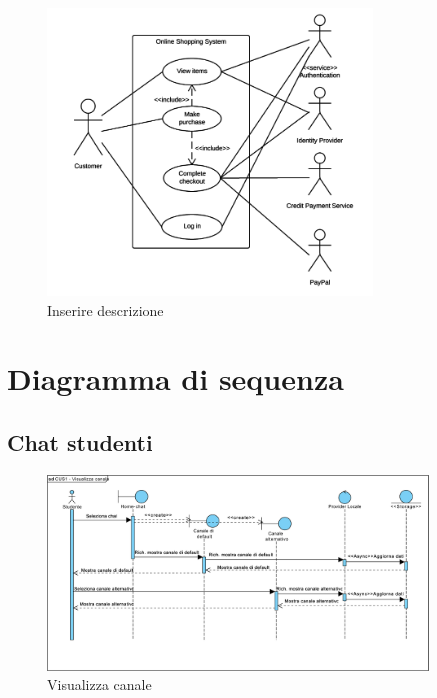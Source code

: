 \begin{figure}
	\centering
	\includegraphics[height=3in]{imgs/file-comuni-ai-gruppi/useCaseEsempio.png}
	\caption{Inserire descrizione}
	\label{fig:prova}
\end{figure}

\section{Diagramma di sequenza}

\subsection{Chat studenti}
\begin{figure}
	\centering
	\includegraphics[width=0.9\textwidth]{imgs/gruppo6/sequence/CUS1_visualizza_canale.pdf}
	\caption{Visualizza canale}
	\label{fig:}
\end{figure}

